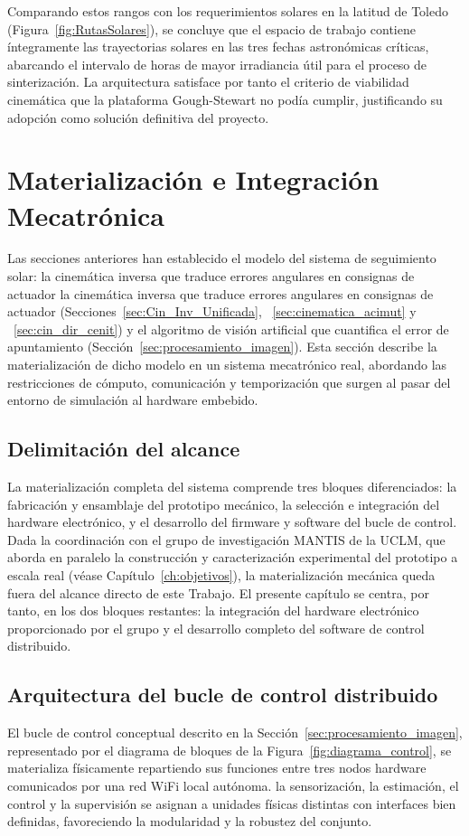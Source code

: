 Comparando estos rangos con los requerimientos solares en la latitud de Toledo (Figura~\ref{fig:RutasSolares}), se concluye que el espacio de trabajo contiene íntegramente las trayectorias solares en las tres fechas astronómicas críticas, abarcando el intervalo de horas de mayor irradiancia útil para el proceso de sinterización. La arquitectura satisface por tanto el criterio de viabilidad cinemática que la plataforma Gough-Stewart no podía cumplir, justificando su adopción como solución definitiva del proyecto.


\section{Materialización e Integración Mecatrónica}
\label{sec:Materializacion}

Las secciones anteriores han establecido el modelo del sistema de seguimiento solar: la cinemática inversa que traduce errores angulares en consignas de actuador la cinemática inversa que traduce errores angulares en consignas de actuador (Secciones~\ref{sec:Cin_Inv_Unificada}, ~\ref{sec:cinematica_acimut} y ~\ref{sec:cin_dir_cenit}) y el algoritmo de visión artificial que cuantifica el error de apuntamiento (Sección~\ref{sec:procesamiento_imagen}). Esta sección describe la materialización de dicho modelo en un sistema mecatrónico real, abordando las restricciones de cómputo, comunicación y temporización que surgen al pasar del entorno de simulación al hardware embebido.

\subsection{Delimitación del alcance}
La materialización completa del sistema comprende tres bloques diferenciados: la fabricación y ensamblaje del prototipo mecánico, la selección e integración del hardware electrónico, y el desarrollo del firmware y software del bucle de control. Dada la coordinación con el grupo de investigación MANTIS de la UCLM, que aborda en paralelo la construcción y caracterización experimental del prototipo a escala real (véase Capítulo~\ref{ch:objetivos}), la materialización mecánica queda fuera del alcance directo de este Trabajo. El presente capítulo se centra, por tanto, en los dos bloques restantes: la integración del hardware electrónico proporcionado por el grupo y el desarrollo completo del software de control distribuido.

\subsection{Arquitectura del bucle de control distribuido}
\label{sec:arquitectura_distribuida}
El bucle de control conceptual descrito en la Sección~\ref{sec:procesamiento_imagen}, representado por el diagrama de bloques de la Figura~\ref{fig:diagrama_control}, se materializa físicamente repartiendo sus funciones entre tres nodos hardware comunicados por una red WiFi local autónoma. la sensorización, la estimación, el control y la supervisión se asignan a unidades físicas distintas con interfaces bien definidas, favoreciendo la modularidad y la robustez del conjunto.

